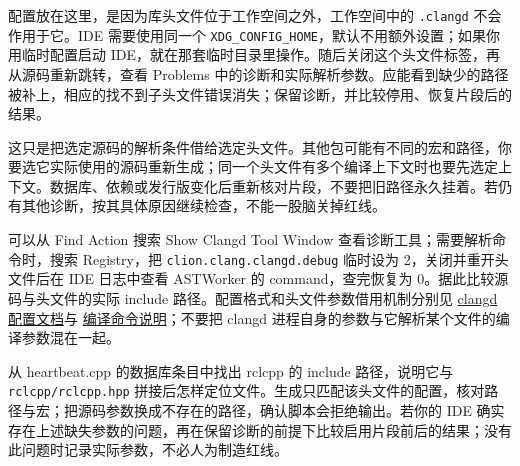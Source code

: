 \begin{example}[给指定头文件补上当前源码的解析参数]
\par\medskip\noindent\begin{minipage}{\linewidth}
\end{minipage}\par\smallskip
配置放在这里，是因为库头文件位于工作空间之外，工作空间中的 \texttt{.clangd} 不会作用于它。IDE 需要使用同一个 \texttt{XDG\_CONFIG\_HOME}，默认不用额外设置；如果你用临时配置启动 IDE，就在那套临时目录里操作。随后关闭这个头文件标签，再从源码重新跳转，查看 Problems 中的诊断和实际解析参数。应能看到缺少的路径被补上，相应的找不到子头文件错误消失；保留诊断，并比较停用、恢复片段后的结果。

这只是把选定源码的解析条件借给选定头文件。其他包可能有不同的宏和路径，你要选它实际使用的源码重新生成；同一个头文件有多个编译上下文时也要先选定上下文。数据库、依赖或发行版变化后重新核对片段，不要把旧路径永久挂着。若仍有其他诊断，按其具体原因继续检查，不能一股脑关掉红线。
\end{example}

\begin{note}
可以从 Find Action 搜索 Show Clangd Tool Window 查看诊断工具；需要解析命令时，搜索 Registry，把 \texttt{clion.clang.clangd.debug} 临时设为 2，关闭并重开头文件后在 IDE 日志中查看 ASTWorker 的 command，查完恢复为 0。据此比较源码与头文件的实际 include 路径。配置格式和头文件参数借用机制分别见 \href{https://clangd.llvm.org/config}{clangd 配置文档}与 \href{https://clangd.llvm.org/design/compile-commands}{编译命令说明}；不要把 clangd 进程自身的参数与它解析某个文件的编译参数混在一起。
\end{note}

\begin{exercise}
\label{ex:v2-ros-header-context}
从 heartbeat.cpp 的数据库条目中找出 rclcpp 的 include 路径，说明它与 \texttt{rclcpp/rclcpp.hpp} 拼接后怎样定位文件。生成只匹配该头文件的配置，核对路径与宏；把源码参数换成不存在的路径，确认脚本会拒绝输出。若你的 IDE 确实存在上述缺失参数的问题，再在保留诊断的前提下比较启用片段前后的结果；没有此问题时记录实际参数，不必人为制造红线。
\end{exercise}

